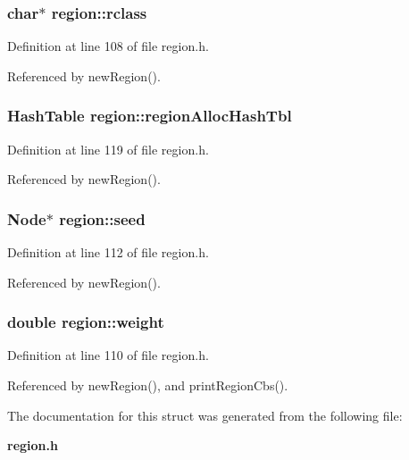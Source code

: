 \subsubsection{\setlength{\rightskip}{0pt plus 5cm}char$\ast$ \bf{region::rclass}}\label{structregion_ed09a97e0a33562fd0779fb48cbd7ea1}




Definition at line 108 of file region.h.

Referenced by new\-Region().
\subsubsection{\setlength{\rightskip}{0pt plus 5cm}\bf{Hash\-Table} \bf{region::region\-Alloc\-Hash\-Tbl}}\label{structregion_f252a4b9cf51e999534746c98cd6304e}




Definition at line 119 of file region.h.

Referenced by new\-Region().
\subsubsection{\setlength{\rightskip}{0pt plus 5cm}\bf{Node}$\ast$ \bf{region::seed}}\label{structregion_58dc6618e3cdb6701c55b93ac4f96f58}




Definition at line 112 of file region.h.

Referenced by new\-Region().
\subsubsection{\setlength{\rightskip}{0pt plus 5cm}double \bf{region::weight}}\label{structregion_e8d49a2999c0fe09adb215e08a183e02}




Definition at line 110 of file region.h.

Referenced by new\-Region(), and print\-Region\-Cbs().

The documentation for this struct was generated from the following file:\begin{CompactItemize}
\item 
\bf{region.h}\end{CompactItemize}
